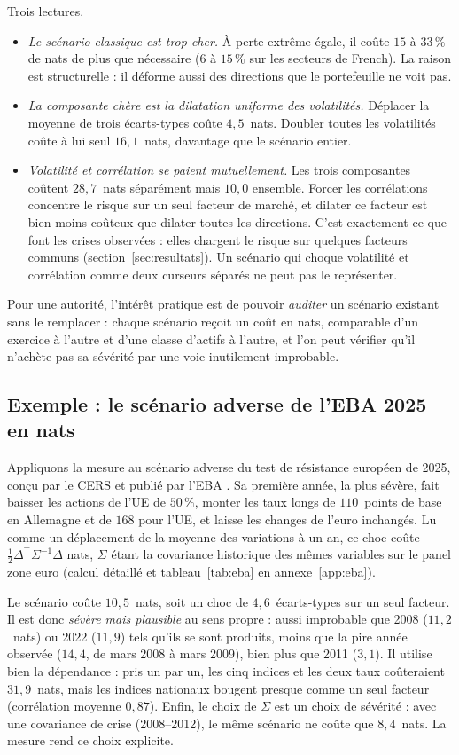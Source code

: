 \documentclass[11pt]{article}
\theoremstyle{definition}
\begin{document}
Trois lectures.
\begin{itemize}
\item \emph{Le scénario classique est trop cher.} À perte extrême égale, il
coûte $15$ à $33\,\%$ de nats de plus que nécessaire ($6$ à $15\,\%$ sur les
secteurs de French). La raison est structurelle : il déforme aussi des
directions que le portefeuille ne voit pas.
\item \emph{La composante chère est la dilatation uniforme des volatilités.}
Déplacer la moyenne de trois écarts-types coûte $4{,}5$~nats. Doubler toutes
les volatilités coûte à lui seul $16{,}1$~nats, davantage que le scénario
entier.
\item \emph{Volatilité et corrélation se paient mutuellement.} Les trois
composantes coûtent $28{,}7$~nats séparément mais $10{,}0$ ensemble. Forcer
les corrélations concentre le risque sur un seul facteur de marché, et dilater
ce facteur est bien moins coûteux que dilater toutes les directions. C'est
exactement ce que font les crises observées : elles chargent le risque sur
quelques facteurs communs (section~\ref{sec:resultats}). Un scénario qui
choque volatilité et corrélation comme deux curseurs séparés ne peut pas le
représenter.
\end{itemize}
Pour une autorité, l'intérêt pratique est de pouvoir \emph{auditer} un
scénario existant sans le remplacer : chaque scénario reçoit un coût en nats,
comparable d'un exercice à l'autre et d'une classe d'actifs à l'autre, et l'on
peut vérifier qu'il n'achète pas sa sévérité par une voie inutilement
improbable.

\subsection{Exemple : le scénario adverse de l'EBA 2025 en nats}
\label{sec:eba}

Appliquons la mesure au scénario adverse du test de résistance européen de
2025, conçu par le CERS et publié par l'EBA \citep{eba2025}. Sa première
année, la plus sévère, fait baisser les actions de l'UE de $50\,\%$, monter
les taux longs de $110$~points de base en Allemagne et de $168$ pour l'UE, et
laisse les changes de l'euro inchangés. Lu comme un déplacement de la moyenne
des variations à un an, ce choc coûte $\tfrac12\Delta^\top\Sigma^{-1}\Delta$
nats, $\Sigma$ étant la covariance historique des mêmes variables sur le panel
zone euro (calcul détaillé et tableau~\ref{tab:eba} en annexe~\ref{app:eba}).

Le scénario coûte $10{,}5$~nats, soit un choc de $4{,}6$~écarts-types sur un
seul facteur. Il est donc \emph{sévère mais plausible} au sens propre : aussi
improbable que 2008 ($11{,}2$~nats) ou 2022 ($11{,}9$) tels qu'ils se sont
produits, moins que la pire année observée ($14{,}4$, de mars 2008 à mars
2009), bien plus que 2011 ($3{,}1$). Il utilise bien la dépendance : pris un par un, les cinq
indices et les deux taux coûteraient $31{,}9$~nats, mais les indices nationaux
bougent presque comme un seul facteur (corrélation moyenne $0{,}87$). Enfin,
le choix de $\Sigma$ est un choix de sévérité : avec une covariance de crise
(2008--2012), le même scénario ne coûte que $8{,}4$~nats. La mesure rend ce
choix explicite.
\end{document}
